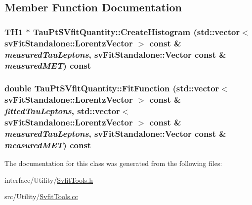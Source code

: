 \subsection{Member Function Documentation}
\hypertarget{classTauPtSVfitQuantity_ad70e485e952a6f8e916d7d812b7e7ca1}{
\subsubsection[{CreateHistogram}]{\setlength{\rightskip}{0pt plus 5cm}TH1 $\ast$ TauPtSVfitQuantity::CreateHistogram (std::vector$<$ svFitStandalone::LorentzVector $>$ const \& {\em measuredTauLeptons}, \/  svFitStandalone::Vector const \& {\em measuredMET}) const}}
\label{classTauPtSVfitQuantity_ad70e485e952a6f8e916d7d812b7e7ca1}
\hypertarget{classTauPtSVfitQuantity_a5227419cdf4277840c130c2557067de2}{
\subsubsection[{FitFunction}]{\setlength{\rightskip}{0pt plus 5cm}double TauPtSVfitQuantity::FitFunction (std::vector$<$ svFitStandalone::LorentzVector $>$ const \& {\em fittedTauLeptons}, \/  std::vector$<$ svFitStandalone::LorentzVector $>$ const \& {\em measuredTauLeptons}, \/  svFitStandalone::Vector const \& {\em measuredMET}) const}}
\label{classTauPtSVfitQuantity_a5227419cdf4277840c130c2557067de2}


The documentation for this class was generated from the following files:\begin{DoxyCompactItemize}
\item 
interface/Utility/\hyperlink{SvfitTools_8h}{SvfitTools.h}\item 
src/Utility/\hyperlink{SvfitTools_8cc}{SvfitTools.cc}\end{DoxyCompactItemize}
